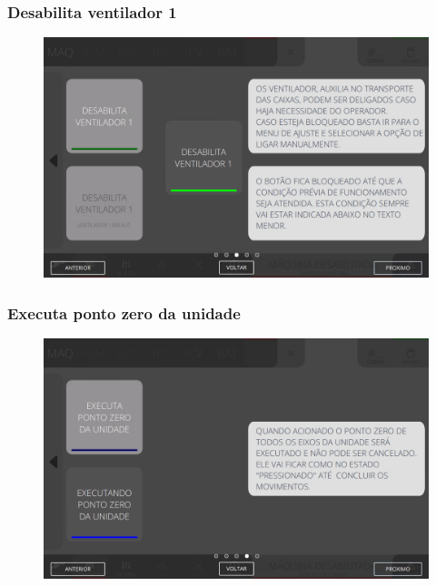 \newpage
\thispagestyle{fancy}
\vspace*{40 pt}
\subsubsection{\small {Desabilita ventilador 1}} \label{sec:telaComandosEmpilhadorDesabilitaVentilador1}
\vspace*{\fill}
\begin{figure}[h]
    \centering
    \includegraphics[width=576 px,height=360 px]{src/imagesICV/08-stacker/commands/e-3.png}
\end{figure}
\vspace*{\fill}

\newpage
\thispagestyle{fancy}
\vspace*{40 pt}
\subsubsection{\small {Executa ponto zero da unidade}} \label{sec:telaComandosEmpilhadorExecutaPontoZeroUnidade}
\vspace*{\fill}
\begin{figure}[h]
    \centering
    \includegraphics[width=576 px,height=360 px]{src/imagesICV/08-stacker/commands/e-4.png}
\end{figure}
\vspace*{\fill}

